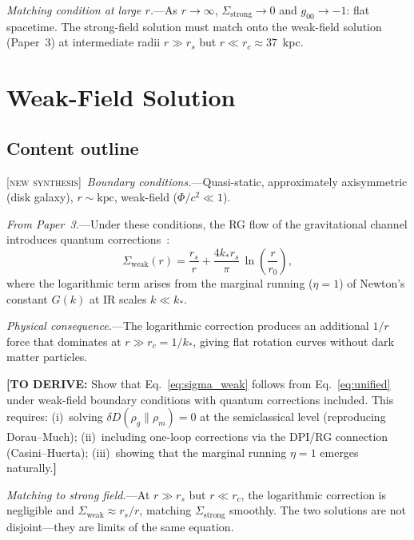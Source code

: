 \documentclass[prl,twocolumn,superscriptaddress,longbibliography,floatfix]{revtex4-2}
\newcommand{\newsyn}{\textsc{[new synthesis]}}
\newcommand{\toderive}[1]{{\color{red}\textbf{[TO DERIVE:} #1\textbf{]}}}
\begin{document}
\emph{Matching condition at large $r$.}---As $r \to \infty$,
$\Sigma_{\mathrm{strong}} \to 0$ and $g_{00} \to -1$: flat
spacetime. The strong-field solution must match onto the weak-field
solution (Paper~3) at intermediate radii $r \gg r_s$ but
$r \ll r_c \approx 37$~kpc.

\section{Weak-Field Solution}
\label{sec:weak_field}

\subsection*{Content outline}

\newsyn\ \emph{Boundary conditions.}---Quasi-static, approximately
axisymmetric (disk galaxy), $r \sim \mathrm{kpc}$, weak-field
($\Phi/c^2 \ll 1$).

\emph{From Paper~3.}---Under these conditions, the RG flow of the
gravitational channel introduces quantum corrections~\cite{Paper3}:
\begin{equation}
\Sigma_{\mathrm{weak}}(r) = \frac{r_s}{r}
  + \frac{4k_* r_s}{\pi}\,\ln\!\left(\frac{r}{r_0}\right),
\label{eq:sigma_weak}
\end{equation}
where the logarithmic term arises from the marginal running
($\eta = 1$) of Newton's constant $G(k)$ at IR scales
$k \ll k_*$.

\emph{Physical consequence.}---The logarithmic correction produces
an additional $1/r$ force that dominates at $r \gg r_c = 1/k_*$,
giving flat rotation curves without dark matter particles.

\toderive{Show that Eq.~\eqref{eq:sigma_weak} follows from
Eq.~\eqref{eq:unified} under weak-field boundary conditions with
quantum corrections included. This requires:
(i)~solving $\delta D(\rho_g \| \rho_m) = 0$ at the semiclassical
level (reproducing Dorau--Much);
(ii)~including one-loop corrections via the DPI/RG connection
(Casini--Huerta);
(iii)~showing that the marginal running $\eta = 1$ emerges
naturally.}

\emph{Matching to strong field.}---At $r \gg r_s$ but $r \ll r_c$,
the logarithmic correction is negligible and
$\Sigma_{\mathrm{weak}} \approx r_s/r$, matching
$\Sigma_{\mathrm{strong}}$ smoothly. The two solutions are not
disjoint---they are limits of the same equation.
\end{document}
